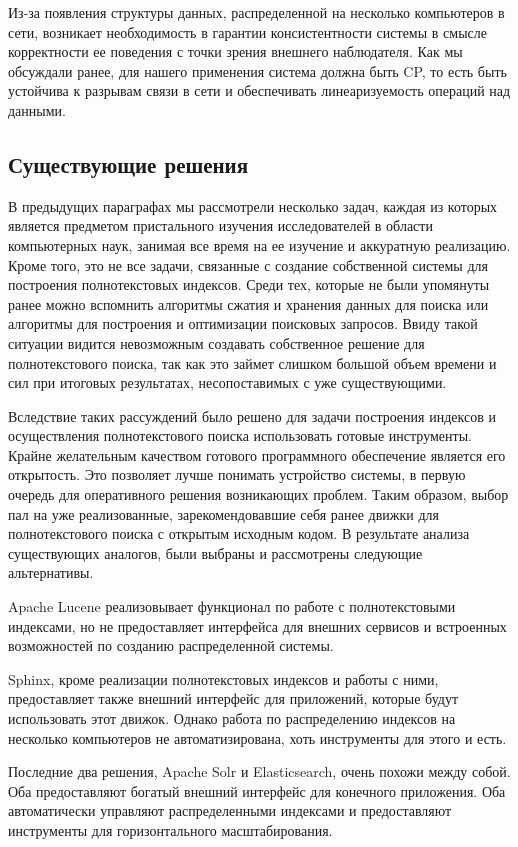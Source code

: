 Из-за появления структуры данных, распределенной на несколько компьютеров в сети, возникает необходимость в гарантии консистентности системы в смысле корректности ее поведения с точки зрения внешнего наблюдателя. Как мы обсуждали ранее, для нашего применения система должна быть CP, то есть быть устойчива к разрывам связи в сети и обеспечивать линеаризуемость операций над данными.

\subsection{Существующие решения}

В предыдущих параграфах мы рассмотрели несколько задач, каждая из которых является предметом пристального изучения исследователей в области компьютерных наук, занимая все время на ее изучение и аккуратную реализацию. Кроме того, это не все задачи, связанные с создание собственной системы для построения полнотекстовых индексов. Среди тех, которые не были упомянуты ранее можно вспомнить алгоритмы сжатия и хранения данных для поиска или алгоритмы для построения и оптимизации поисковых запросов. Ввиду такой ситуации видится невозможным создавать собственное решение для полнотекстового поиска, так как это займет слишком большой объем времени и сил при итоговых результатах, несопоставимых с уже существующими.

Вследствие таких рассуждений было решено для задачи построения индексов и осуществления полнотекстового поиска использовать готовые инструменты. Крайне желательным качеством готового программного обеспечение является его открытость. Это позволяет лучше понимать устройство системы, в первую очередь для оперативного решения возникающих проблем. Таким образом, выбор пал на уже реализованные, зарекомендовавшие себя ранее движки для полнотекстового поиска с открытым исходным кодом. В результате анализа существующих аналогов, были выбраны и рассмотрены следующие альтернативы.

Apache Lucene\cite{lucene} реализовывает функционал по работе с полнотекстовыми индексами, но не предоставляет интерфейса для внешних сервисов и встроенных возможностей по созданию распределенной системы.

Sphinx, кроме реализации полнотекстовых индексов и работы с ними, предоставляет также внешний интерфейс для приложений, которые будут использовать этот движок. Однако работа по распределению индексов на несколько компьютеров не автоматизирована, хоть инструменты для этого и есть.

Последние два решения, Apache Solr и Elasticsearch, очень похожи между собой. Оба предоставляют богатый внешний интерфейс для конечного приложения. Оба автоматически управляют распределенными индексами и предоставляют инструменты для горизонтального масштабирования.

